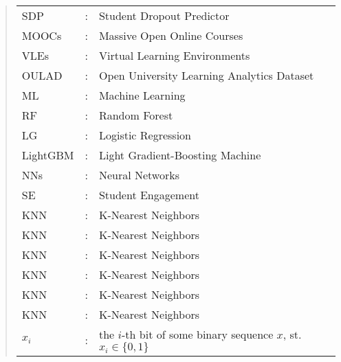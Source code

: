 \documentclass[ %
                    author={Carlos Duran Calle},
                supervisor={Dr. Felipe Campelo},
                    degree={MSc},
                     title={Comparative Machine Learning Analysis for Student Dropout Prediction in a Virtual Learning Environment},
                  subtitle={Incorporating Student Engagement and Socio-Economic Features},
                      type={},
                      year={2025}]{dissertation}
\begin{document}
\vspace{1cm} 

%

\begin{quote}
\noindent
\begin{tabular}{lcl}
SDP                 &:     & Student Dropout Predictor	\\
MOOCs               &:     & Massive Open Online Courses	\\
VLEs                &:     & Virtual Learning Environments	\\
OULAD               &:     & Open University Learning Analytics Dataset	\\
ML                  &:     & Machine Learning	\\
RF                  &:     & Random Forest	\\
LG                  &:     & Logistic Regression	\\
LightGBM            &:     & Light Gradient-Boosting Machine	\\
NNs                 &:     & Neural Networks	\\
SE                  &:     & Student Engagement	\\
KNN                 &:     & K-Nearest Neighbors	\\
KNN                 &:     & K-Nearest Neighbors	\\
KNN                 &:     & K-Nearest Neighbors	\\
KNN                 &:     & K-Nearest Neighbors	\\
KNN                 &:     & K-Nearest Neighbors	\\
KNN                 &:     & K-Nearest Neighbors	\\
$x_i$               &:     & the $i$-th bit of some binary sequence $x$, st. $x_i \in \{ 0, 1 \}$ \\
\end{tabular}
\end{quote}
\end{document}
